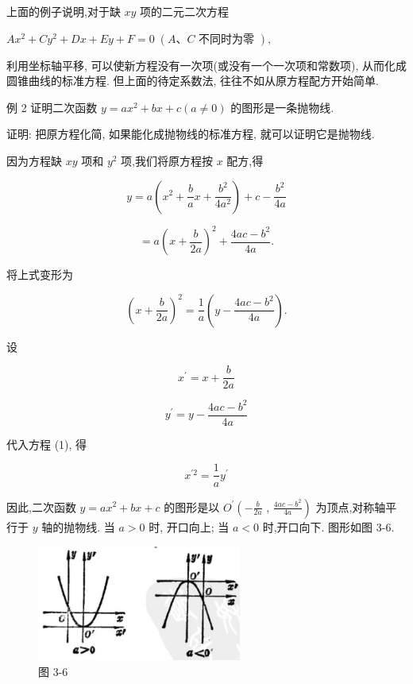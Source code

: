\documentclass[lang=cn,newtx,10.5pt,scheme=chinese]{elegantbook}
\begin{document}
上面的例子说明,对于缺 \({xy}\) 项的二元二次方程

\(A{x}^{2} + C{y}^{2} + {Dx} + {Ey} + F = 0\;\left( {A\text{、}C\text{ 不同时为零 }}\right) ,\)

利用坐标轴平移, 可以使新方程没有一次项(或没有一个一次项和常数项), 从而化成圆锥曲线的标准方程. 但上面的待定系数法, 往往不如从原方程配方开始简单.

例 2 证明二次函数 \(y = a{x}^{2} + {bx} + c\left( {a \neq 0}\right)\) 的图形是一条抛物线.

证明: 把原方程化简, 如果能化成抛物线的标准方程, 就可以证明它是抛物线.

因为方程缺 \({xy}\) 项和 \({y}^{2}\) 项,我们将原方程按 \(x\) 配方,得

\[
  y = a\left( {{x}^{2} + \frac{b}{a}x + \frac{{b}^{2}}{4{a}^{2}}}\right) + c - \frac{{b}^{2}}{4a}
\]

\[
  = a{\left( x + \frac{b}{2a}\right) }^{2} + \frac{{4ac} - {b}^{2}}{4a}.
\]

将上式变形为

\[
    {\left( x + \frac{b}{2a}\right) }^{2} = \frac{1}{a}\left( {y - \frac{{4ac} - {b}^{2}}{4a}}\right) . \tag{1}
\]

设

\[
    {x}^{\prime } = x + \frac{b}{2a}
\]

\[
    {y}^{\prime } = y - \frac{{4ac} - {b}^{2}}{4a}
\]

代入方程 (1), 得

\[
    {x}^{\prime 2} = \frac{1}{a}{y}^{\prime }
\]

因此,二次函数 \(y = a{x}^{2} + {bx} + c\) 的图形是以 \({O}^{\prime }\left( {-\frac{b}{2a}}\right.\) , \(\left. \frac{{4ac} - {b}^{2}}{4a}\right)\) 为顶点,对称轴平行于 \(y\) 轴的抛物线. 当 \(a > 0\) 时, 开口向上; 当 \(a < 0\) 时,开口向下. 图形如图 3-6.

\begin{figure}[h]
  \centering
  \includegraphics[max width=0.6\textwidth]{images/01912cc2-ffb6-728e-9ae7-b113ff05c64b_137_787676.jpg}
  \caption{图 3-6}
\end{figure}
\end{document}
